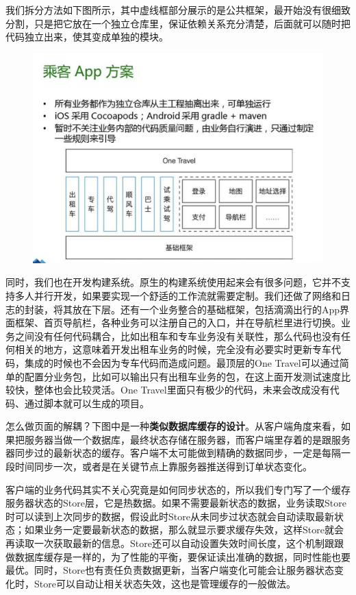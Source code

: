 \documentclass[12pt]{article}
\begin{document}
我们拆分方法如下图所示，其中虚线框部分展示的是公共框架，最开始没有很细致分割，只是把它放在一个独立仓库里，保证依赖关系充分清楚，后面就可以随时把代码独立出来，使其变成单独的模块。

\begin{figure}[H]
    \centering
    \includegraphics[width=1\textwidth]{fig/DIDI_Reconstruction_13.png}
\end{figure}

同时，我们也在开发构建系统。原生的构建系统使用起来会有很多问题，它并不支持多人并行开发，如果要实现一个舒适的工作流就需要定制。我们还做了网络和日志的封装，将其放在下层。还有一个业务整合的基础框架，包括滴滴出行的App界面框架、首页导航栏，各种业务可以注册自己的入口，并在导航栏里进行切换。业务之间没有任何代码耦合，比如出租车和专车业务没有关联性，那么代码也没有任何相关的地方，这意味着开发出租车业务的时候，完全没有必要实时更新专车代码，集成的时候也不会因为专车代码而造成问题。最顶层的One Travel可以通过简单的配置分业务包，比如可以输出只有出租车业务的包，在这上面开发测试速度比较快，整体也会比较灵活。One Travel里面只有极少的代码，未来会改成没有代码、通过脚本就可以生成的项目。

怎么做页面的解耦？下图中是一种\textbf{类似数据库缓存的设计}。从客户端角度来看，如果把服务器当做一个数据库，最终状态存储在服务器，而客户端里存着的是跟服务器同步过的最新状态的缓存。客户端不太可能做到精确的数据同步，一定是每隔一段时间同步一次，或者是在关键节点上靠服务器推送得到订单状态变化。

客户端的业务代码其实不关心究竟是如何同步状态的，所以我们专门写了一个缓存服务器状态的Store层，它是热数据。如果不需要最新状态的数据，业务读取Store时可以读到上次同步的数据，假设此时Store从未同步过状态就会自动读取最新状态；如果业务一定要最新状态的数据，那么就显示要求缓存失效，这样Store就会再读取一次获取最新的信息。Store还可以自动设置失效时间长度，这个机制跟跟做数据库缓存是一样的，为了性能的平衡，要保证读出准确的数据，同时性能也要最优。同时，Store也有责任负责数据更新，当客户端变化可能会让服务器状态变化时，Store可以自动让相关状态失效，这也是管理缓存的一般做法。
\end{document}
